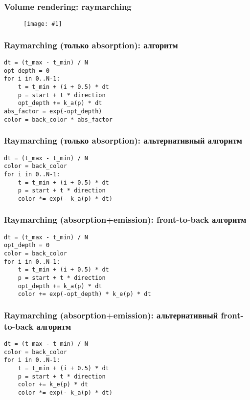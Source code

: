 \documentclass{beamer}
\newcommand{\slideimage}[1]{
  \begin{figure}
    \begin{adjustbox}{width=\textwidth, totalheight=\textheight-2\baselineskip-2\baselineskip,keepaspectratio}
      \texttt{[image: \#1]}
    \end{adjustbox}
  \end{figure}
}
\begin{document}
\begin{frame}[fragile]
\frametitle{Volume rendering: raymarching}
\slideimage{raymarching-2.png}
\end{frame}

\begin{frame}[fragile]
\frametitle{Raymarching (только absorption): алгоритм}
\begin{verbatim}
dt = (t_max - t_min) / N
opt_depth = 0
for i in 0..N-1:
    t = t_min + (i + 0.5) * dt
    p = start + t * direction
    opt_depth += k_a(p) * dt
abs_factor = exp(-opt_depth)
color = back_color * abs_factor
\end{verbatim}
\end{frame}

\begin{frame}[fragile]
\frametitle{Raymarching (только absorption): альтернативный алгоритм}
\begin{verbatim}
dt = (t_max - t_min) / N
color = back_color
for i in 0..N-1:
    t = t_min + (i + 0.5) * dt
    p = start + t * direction
    color *= exp(- k_a(p) * dt)
\end{verbatim}
\end{frame}

\begin{frame}[fragile]
\frametitle{Raymarching (absorption+emission): front-to-back алгоритм}
\begin{verbatim}
dt = (t_max - t_min) / N
opt_depth = 0
color = back_color
for i in 0..N-1:
    t = t_min + (i + 0.5) * dt
    p = start + t * direction
    opt_depth += k_a(p) * dt
    color += exp(-opt_depth) * k_e(p) * dt
\end{verbatim}
\end{frame}

\begin{frame}[fragile]
\frametitle{Raymarching (absorption+emission): альтернативный front-to-back алгоритм}
\begin{verbatim}
dt = (t_max - t_min) / N
color = back_color
for i in 0..N-1:
    t = t_min + (i + 0.5) * dt
    p = start + t * direction
    color += k_e(p) * dt
    color *= exp(- k_a(p) * dt)
\end{verbatim}
\end{frame}
\end{document}
